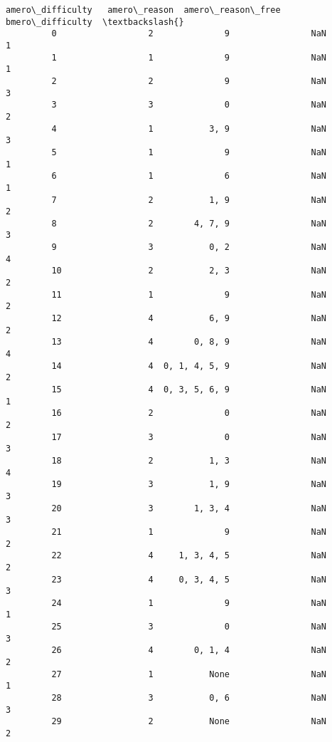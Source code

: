 \documentclass[11pt]{article}
\begin{document}
\begin{Verbatim}[commandchars=\\\{\}]
             amero\_difficulty   amero\_reason  amero\_reason\_free  bmero\_difficulty  \textbackslash{}
         0                  2              9                NaN                 1   
         1                  1              9                NaN                 1   
         2                  2              9                NaN                 3   
         3                  3              0                NaN                 2   
         4                  1           3, 9                NaN                 3   
         5                  1              9                NaN                 1   
         6                  1              6                NaN                 1   
         7                  2           1, 9                NaN                 2   
         8                  2        4, 7, 9                NaN                 3   
         9                  3           0, 2                NaN                 4   
         10                 2           2, 3                NaN                 2   
         11                 1              9                NaN                 2   
         12                 4           6, 9                NaN                 2   
         13                 4        0, 8, 9                NaN                 4   
         14                 4  0, 1, 4, 5, 9                NaN                 2   
         15                 4  0, 3, 5, 6, 9                NaN                 1   
         16                 2              0                NaN                 2   
         17                 3              0                NaN                 3   
         18                 2           1, 3                NaN                 4   
         19                 3           1, 9                NaN                 3   
         20                 3        1, 3, 4                NaN                 3   
         21                 1              9                NaN                 2   
         22                 4     1, 3, 4, 5                NaN                 2   
         23                 4     0, 3, 4, 5                NaN                 3   
         24                 1              9                NaN                 1   
         25                 3              0                NaN                 3   
         26                 4        0, 1, 4                NaN                 2   
         27                 1           None                NaN                 1   
         28                 3           0, 6                NaN                 3   
         29                 2           None                NaN                 2   

\end{Verbatim}
\end{document}
